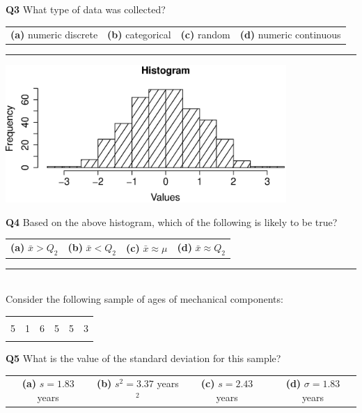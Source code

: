 \documentclass[12pt]{article}
\begin{document}
{\bf Q3} What type of data was collected?\\[0.2cm]
\begin{tabular}{cccc}
{\bf(a)} numeric discrete & {\bf(b)} categorical & {\bf(c)} random & {\bf(d)} numeric continuous\\[0.6cm]
\end{tabular}

\rule{\linewidth}{1pt}
\begin{center}
\includegraphics[width=0.8\textwidth, trim = 0.0cm 0.6cm 1.5cm 0.8cm, clip]{Hist}
\end{center}
{\bf Q4} Based on the above histogram, which of the following is likely to be true?\\[0.2cm]
\begin{tabular}{cccc}
{\bf(a)} $\bar x > Q_2$ & {\bf(b)} $\bar x < Q_2$ & {\bf(c)} $\bar x \approx \mu$  & {\bf(d)} $\bar x \approx Q_2$ \\[0.6cm]
\end{tabular}


\rule{\linewidth}{1pt}

\quad\\
Consider the following sample of ages of mechanical components:
\begin{center}
\begin{tabular}{|cccccc|}
\hline
&&&&&\\[-0.4cm]
5 & 1 & 6 & 5 & 5 & 3\\
\hline
\multicolumn{6}{c}{}
\end{tabular}
\end{center}

{\bf Q5} What is the value of the standard deviation for this sample?\\[0.2cm]
\begin{tabular}{cccc}
{\bf(a)} $s = 1.83$ years & {\bf(b)} $s^2 = 3.37$ years$^2$ & {\bf(c)} $s = 2.43$ years & {\bf(d)} $\sigma = 1.83$ years \\[0.6cm]
\end{tabular}
\end{document}
